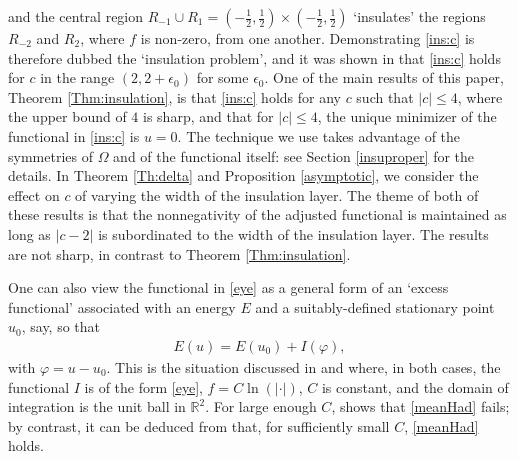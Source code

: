 \documentclass[12pt]{amsart}
\newcommand{\R}{\mathbb{R}}
\newcommand{\om}{\Omega}
\newcommand{\1}{{\bf 1}}
\begin{document}
and the central region $R_{-1}\cup R_{1}=(-\frac{1}{2},\frac{1}{2})\times (-\frac{1}{2},\frac{1}{2})$ `insulates' the regions $R_{-2}$ and $R_2$, where $f$ is non-zero, from one another.  Demonstrating \eqref{ins:c} is therefore dubbed the `insulation problem', and it was shown in \cite[Proposition 4.5]{BKV23} that \eqref{ins:c} holds for $c$ in the range $(2,2+\epsilon_0)$ for some $\epsilon_0$.  One of the main results of this paper, Theorem \ref{Thm:insulation}, is that \eqref{ins:c} holds for any $c$ such that $|c|\leq 4$, where the upper bound of $4$ is sharp, and that for $|c|\leq 4$, the unique minimizer of the functional in \eqref{ins:c} is $u=0$.  The technique we use takes advantage of the symmetries of $\om$ and of the functional itself: see Section \ref{insuproper} for the details.  In Theorem \ref{Th:delta} and Proposition \ref{asymptotic}, we consider the effect on $c$ of varying the width of the insulation layer.  The theme of both of these results is that the nonnegativity of the adjusted functional is maintained as long as $|c-2|$ is subordinated to the width of the insulation layer.  The results are not sharp, in contrast to Theorem \ref{Thm:insulation}. 

One can also view the functional in \eqref{eye} as a general form of an `excess functional' associated with an energy $E$ and a suitably-defined stationary point $u_0$, say, so that 
\begin{align}\label{splitting} E(u) = E(u_0)+I(\varphi),\end{align}
with $\varphi=u-u_0$. This is the situation discussed in  \cite{Bevan-14} and \cite{BD22} where, in both cases, the functional $I$ is of the form \eqref{eye}, $f=C\ln(|\cdot|)$, $C$ is constant, and the domain of integration is the unit ball in $\R^2$.  For large enough $C$, \cite[Proposition 3.5 (i)]{Bevan-14} shows that \eqref{meanHad} fails;  by contrast, it can be deduced from \cite[Theorem 1.2]{BD22} that, for sufficiently small $C$, \eqref{meanHad} holds.
\end{document}

